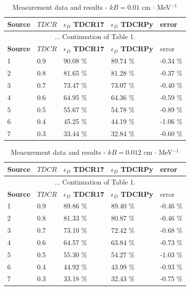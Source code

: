 \documentclass[12pt]{iopart}
\begin{document}
\begingroup
\footnotesize
\begin{longtable}[l]{| p{} | p{} | p{} |p{} |p{} |} 
\caption{Measurement data and results - $kB = 0.01$ cm $\cdot$ MeV$^{-1}$}
\label{Table1} \\ 
\hline
\textbf{Source} & \textbf{$TDCR$} & \textbf{$\epsilon_{D}$ TDCR17} & \textbf{$\epsilon_{D}$ TDCRPy} & error \\ 
\endfirsthead
\multicolumn{5}{c}{... Continuation of Table 1.}\\ 
\hline
 \textbf{Source} & \textbf{$TDCR$} & \textbf{$\epsilon_{D}$ TDCR17} & \textbf{$\epsilon_{D}$ TDCRPy} & error \\   \hline 
\endhead
\hline
 1 &  0.9  &  90.08 \% &   89.74 \% &  -0.34 \% \\
 2 &  0.8  &  81.65 \% &   81.28 \% &  -0.37 \% \\
 3 &  0.7  &  73.47 \% &   73.07 \% &  -0.40 \% \\
 4 &  0.6  &  64.95 \% &   64.36 \% &  -0.59 \% \\
 5 &  0.5  &  55.67 \% &   54.78 \% &  -0.89 \% \\
 6 &  0.4  &  45.25 \% &   44.19 \% &  -1.06 \% \\
 7 &  0.3  &  33.44 \% &   32.84 \% &  -0.60 \% \\
\hline
\end{longtable} 
\endgroup

\begingroup
\footnotesize
\begin{longtable}[l]{| p{} | p{} |p{} |p{} |p{} |} 
\caption{Measurement data and results - $kB = 0.012$ cm $\cdot$ MeV$^{-1}$}
\label{Table1} \\ 
\hline
\textbf{Source} & \textbf{$TDCR$} & \textbf{$\epsilon_{D}$ TDCR17} & \textbf{$\epsilon_{D}$ TDCRPy} & error \\ 
\endfirsthead
\multicolumn{5}{c}{... Continuation of Table 1.}\\ 
\hline
 \textbf{Source} & \textbf{$TDCR$} & \textbf{$\epsilon_{D}$ TDCR17} & \textbf{$\epsilon_{D}$ TDCRPy} & error \\   \hline 
\endhead
\hline
 1 & 0.9   &   89.86 \% &   89.40 \% &  -0.46 \% \\
 2 & 0.8   &   81.33 \% &   80.87 \% &  -0.46 \% \\
 3 & 0.7   &   73.10 \% &   72.42 \% &  -0.68 \% \\
 4 & 0.6   &   64.57 \% &   63.84 \% &  -0.73 \% \\
 5 & 0.5   &   55.30 \% &   54.27 \% &  -1.03 \% \\
 6 & 0.4   &   44.92 \% &   43.99 \% &  -0.93 \% \\
 7 & 0.3   &   33.18 \% &   32.43 \% &  -0.75 \% \\
\hline
\end{longtable} 
\endgroup
\end{document}
